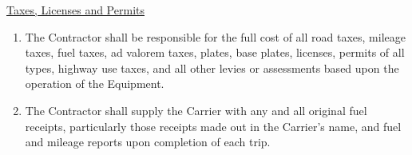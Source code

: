 \underline{Taxes, Licenses and Permits}
\begin{enumerate}[
    ref = \SecondLevelEnumerator
]
    \item The Contractor shall be responsible for the full cost of all road
    taxes, mileage taxes, fuel taxes, ad valorem taxes, plates, base
    plates, licenses, permits of all types, highway use taxes, and all
    other levies or assessments based upon the operation of the Equipment.

    \item The Contractor shall supply the Carrier with any and all original
    fuel receipts, particularly those receipts made out in the Carrier's
    name, and fuel and mileage reports upon completion of each trip.
\end{enumerate}